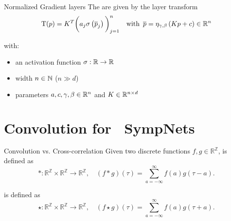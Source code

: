 \begin{frame}[c]{Normalized Gradient layers}
  The  are given by the layer transform
  \begin{equation*}
		\mathrm{T}(p) = K^T \bigg( a_j \sigma
		\left( \overline{p}_j \right) \bigg)_{j=1}^n
		\quad \text{with } \, \overline{p} = \eta_{\gamma, \beta} \left( Kp + c \right) \in \mathbb{R}^n
	\end{equation*}

  with:
  \begin{itemize}
    \item an activation function $\sigma : \mathbb{R} \to \mathbb{R}$
    \item width $n \in \mathbb{N}$ ($n \gg d$)
    \item parameters $a,c,\gamma, \beta \in \mathbb{R}^n$ and $K \in \mathbb{R}^{n \times d}$
  \end{itemize}
\end{frame}

\section{Convolution for ~\newline SympNets}

\begin{frame}[c]{Convolution vs. Cross-correlation}
  Given two discrete functions $f,g \in \mathbb{R}^\mathbb{Z}$, 
   is defined as 
  \begin{equation*}
    *: \mathbb{R}^{\mathbb{Z}} \times \mathbb{R}^{\mathbb{Z}} \to \mathbb{R}^{\mathbb{Z}},
    \quad (f*g)(\tau) = \sum^{\infty}_{a=-\infty} f(a) g(\tau - a)
    .
  \end{equation*}

   is defined as
  \begin{equation*}
    \star: \mathbb{R}^{\mathbb{Z}} \times \mathbb{R}^{\mathbb{Z}} \to \mathbb{R}^{\mathbb{Z}},
    \quad (f \star g)(\tau) = \sum^{\infty}_{a=-\infty} f(a) g(\tau + a)
    .
  \end{equation*}
\end{frame}

